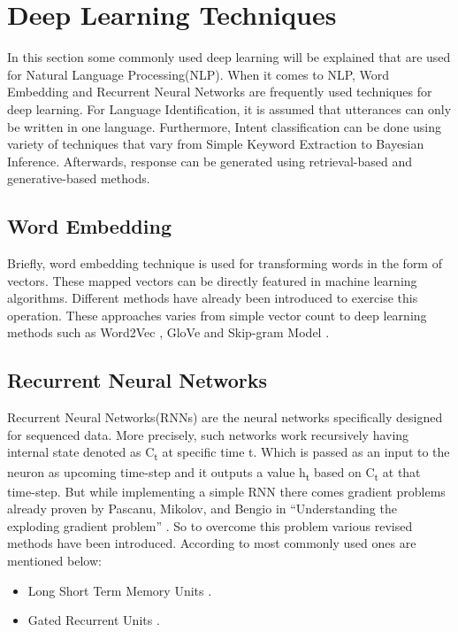 \section{Deep Learning Techniques}
In this section some commonly used deep learning will be explained that are used for Natural Language Processing(NLP). When it comes to NLP, Word Embedding and Recurrent Neural Networks are frequently used techniques for deep learning. For Language Identification, it is assumed that utterances can only be written in one language. Furthermore, Intent classification can be done using variety of techniques that vary from Simple Keyword Extraction to Bayesian Inference. Afterwards, response can be generated using retrieval-based and generative-based methods. \cite{designandimplementation}

\subsection{Word Embedding}
Briefly, word embedding technique is used for transforming words in the form of vectors. These mapped vectors can be directly featured in machine learning algorithms. Different methods have already been introduced to exercise this operation. These approaches varies from simple vector count to deep learning methods such as Word2Vec \cite{word2vec}, GloVe \cite{glove} and Skip-gram Model \cite{skipgram}. \cite{designandimplementation}

\subsection{Recurrent Neural Networks}
Recurrent Neural Networks(RNNs) are the neural networks specifically designed for sequenced data. More precisely, such networks work recursively having internal state denoted as \texorpdfstring{C\textsubscript{t}}{C t} at specific time t. Which is passed as an input to the neuron as upcoming time-step and it outputs a value \texorpdfstring{h\textsubscript{t}}{h t} based on \texorpdfstring{C\textsubscript{t}}{C t} at that time-step. But while implementing a simple RNN there comes gradient problems already proven by Pascanu, Mikolov, and Bengio in “Understanding the exploding gradient problem” \cite{gradientproblem}. So to overcome this problem various revised methods have been introduced. According to \cite{designandimplementation} most commonly used ones are mentioned below: 
\begin{itemize}
\item Long Short Term Memory Units \cite{lstm}.
\item Gated Recurrent Units \cite{gru}.
\end{itemize}

